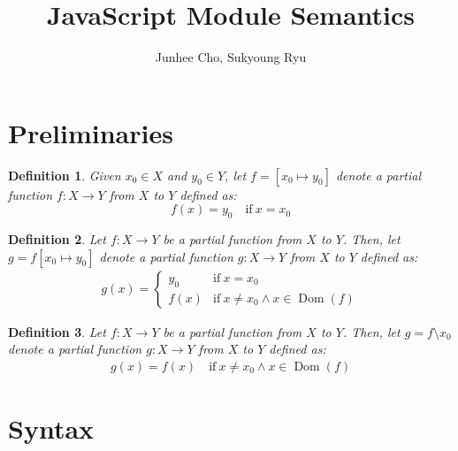 \documentclass[a4paper]{article}
\title{JavaScript Module Semantics \\
       \fbox{\small\it Working Draft}}
\author{Junhee Cho, Sukyoung Ryu}
\newcommand{\dom}{\mathop{\mathrm{Dom}}}
\newcommand{\If}{\mbox{if}}
\newtheorem{Def}{Definition}
\begin{document}
\maketitle

\section{Preliminaries}

\begin{Def}
Given $x_0 \in X$ and $y_0 \in Y$, let $f = [x_0 \mapsto y_0]$ denote a partial function $f: X \rightarrow Y$ from $X$ to $Y$ defined as:
\begin{equation*}
f(x) = y_0 \quad \If\ x = x_0
\end{equation*}
\end{Def}

\begin{Def}
Let $f: X \rightarrow Y$ be a partial function from $X$ to $Y$. Then, let $g = f[x_0 \mapsto y_0]$ denote a partial function $g: X \rightarrow Y$ from $X$ to $Y$ defined as:
\begin{equation*}
\begin{split}
g(x) = \left\{\begin{array}{ll}
y_0 & \If\ x = x_0 \\
f(x) & \If\ x \ne x_0 \wedge x \in \dom(f)
\end{array}\right.
\end{split}
\end{equation*}
\end{Def}

\begin{Def}
Let $f: X \rightarrow Y$ be a partial function from $X$ to $Y$. Then, let $g = f \setminus x_0$ denote a partial function $g: X \rightarrow Y$ from $X$ to $Y$ defined as:
\begin{equation*}
\begin{split}
g(x) = f(x) \quad \mbox{if}\ x \ne x_0 \wedge x \in \dom(f)
\end{split}
\end{equation*}
\end{Def}

\section{Syntax}
\end{document}
